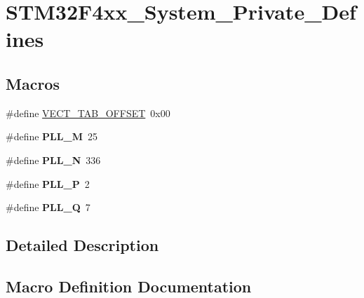 \hypertarget{group___s_t_m32_f4xx___system___private___defines}{}\section{S\+T\+M32\+F4xx\+\_\+\+System\+\_\+\+Private\+\_\+\+Defines}
\label{group___s_t_m32_f4xx___system___private___defines}
\subsection*{Macros}
\begin{DoxyCompactItemize}
\item 
\#define \hyperlink{group___s_t_m32_f4xx___system___private___defines_ga40e1495541cbb4acbe3f1819bd87a9fe}{V\+E\+C\+T\+\_\+\+T\+A\+B\+\_\+\+O\+F\+F\+S\+ET}~0x00
\item 
\#define {\bfseries P\+L\+L\+\_\+M}~25\hypertarget{group___s_t_m32_f4xx___system___private___defines_ga0fa5a868f5cd056a04b1c42e454b9617}{}\label{group___s_t_m32_f4xx___system___private___defines_ga0fa5a868f5cd056a04b1c42e454b9617}

\item 
\#define {\bfseries P\+L\+L\+\_\+N}~336\hypertarget{group___s_t_m32_f4xx___system___private___defines_ga04586ea638d21afe558db4f2798c38a6}{}\label{group___s_t_m32_f4xx___system___private___defines_ga04586ea638d21afe558db4f2798c38a6}

\item 
\#define {\bfseries P\+L\+L\+\_\+P}~2\hypertarget{group___s_t_m32_f4xx___system___private___defines_ga290dcd27167e925d817e8334111c1c01}{}\label{group___s_t_m32_f4xx___system___private___defines_ga290dcd27167e925d817e8334111c1c01}

\item 
\#define {\bfseries P\+L\+L\+\_\+Q}~7\hypertarget{group___s_t_m32_f4xx___system___private___defines_gac958257ddb2537c539cffdb3a4543067}{}\label{group___s_t_m32_f4xx___system___private___defines_gac958257ddb2537c539cffdb3a4543067}

\end{DoxyCompactItemize}


\subsection{Detailed Description}


\subsection{Macro Definition Documentation}
